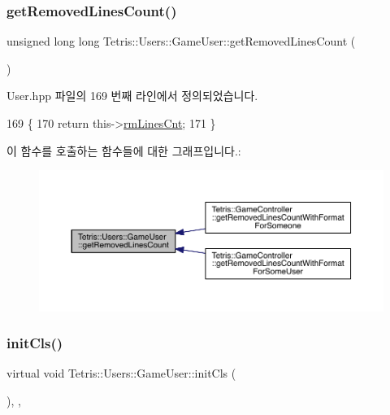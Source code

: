 \subsubsection{\texorpdfstring{get\+Removed\+Lines\+Count()}{getRemovedLinesCount()}}
{\footnotesize\ttfamily unsigned long long Tetris\+::\+Users\+::\+Game\+User\+::get\+Removed\+Lines\+Count (\begin{DoxyParamCaption}{ }\end{DoxyParamCaption})\hspace{0.3cm}{\ttfamily [inline]}}



User.\+hpp 파일의 169 번째 라인에서 정의되었습니다.


\begin{DoxyCode}
169                                                      \{
170                 \textcolor{keywordflow}{return} this->\hyperlink{class_tetris_1_1_users_1_1_game_user_ac5857cc9f0318a8dfbcf551424ccf8f3}{rmLinesCnt};
171             \}
\end{DoxyCode}
이 함수를 호출하는 함수들에 대한 그래프입니다.\+:
\nopagebreak
\begin{figure}[H]
\begin{center}
\leavevmode
\includegraphics[width=350pt]{d8/d9a/class_tetris_1_1_users_1_1_game_user_a5912def4d9d77adbb4323b35366724af_icgraph}
\end{center}
\end{figure}
\mbox{\label{class_tetris_1_1_users_1_1_game_user_a8ec8ca43d0c6d0dc2c2e049ae1b4d316}} 
\subsubsection{\texorpdfstring{init\+Cls()}{initCls()}}
{\footnotesize\ttfamily virtual void Tetris\+::\+Users\+::\+Game\+User\+::init\+Cls (\begin{DoxyParamCaption}{ }\end{DoxyParamCaption})\hspace{0.3cm}{\ttfamily [inline]}, {\ttfamily [protected]}, {\ttfamily [virtual]}}



